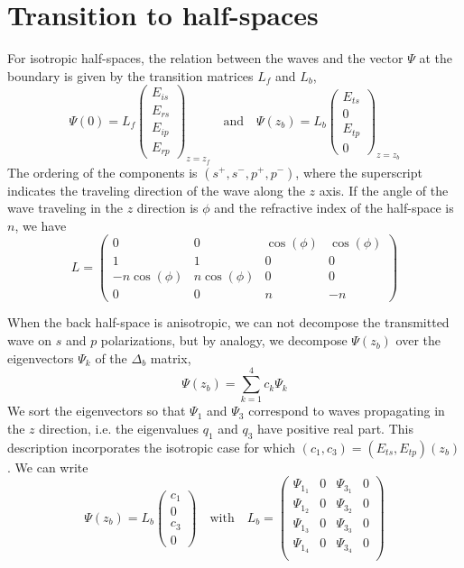 \section{Transition to half-spaces}

For isotropic half-spaces, the relation between the waves and the vector $\Psi$ at the boundary is given by the transition matrices $L_f$ and $L_b$,
$$
\Psi(0) = L_f 
\begin{pmatrix}
E_{is}\\
E_{rs}\\
E_{ip}\\
E_{rp}
\end{pmatrix}_{z=z_f}
\quad\mathrm{and} \quad 
\Psi(z_b) = L_b
\begin{pmatrix}
E_{ts}\\
0 \\
E_{tp}\\
0
\end{pmatrix}_{z=z_b}
$$
The ordering of the components is $(s^+,s^-,p^+,p^-)$, where the superscript indicates the traveling direction of the wave along the $z$ axis.
If the angle of the wave traveling in the $z$ direction is $\phi$ and the refractive index of the half-space is $n$, we have
$$
L = 
\begin{pmatrix}
0 & 0 & \cos(\phi) & \cos(\phi) \\
1 & 1 & 0 & 0 \\
-n \cos(\phi) & n \cos(\phi) & 0 & 0 \\
0 & 0 & n & -n 
\end{pmatrix}
$$

When the back half-space is anisotropic, we can not decompose the transmitted wave on $s$ and $p$ polarizations, but by analogy, we decompose $\Psi(z_b)$ over the eigenvectors $\Psi_k$ of the $\Delta_b$ matrix, 
$$
\Psi(z_b)= \sum_{k=1}^4 c_k \Psi_k
$$
We sort the eigenvectors so that $\Psi_1$ and $\Psi_3$ correspond to waves propagating in the $z$ direction, i.e. the eigenvalues $q_1$ and $q_3$ have positive real part.
This description incorporates the isotropic case for which $(c_1,c_3) = (E_{ts}, E_{tp})(z_b)$.
We can write 
$$
\Psi(z_b) = L_b
\begin{pmatrix}
c_1\\
0 \\
c_3\\
0
\end{pmatrix}
\quad\mathrm{with}\quad
L_b =
\begin{pmatrix} 
\Psi_{1_1} & 0 & \Psi_{3_1} & 0 \\ 
\Psi_{1_2} & 0 & \Psi_{3_2} & 0 \\ 
\Psi_{1_3} & 0 & \Psi_{3_3} & 0 \\ 
\Psi_{1_4} & 0 & \Psi_{3_4} & 0 \\ 
\end{pmatrix}
$$


